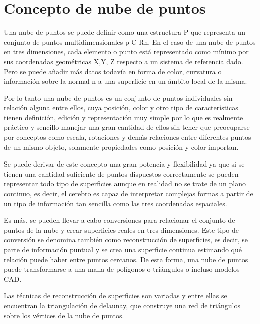 \section{Concepto de nube de puntos}

Una nube de puntos se puede definir como una estructura P que representa un conjunto de puntos multidimensionales p C Rn. En el caso de una nube de puntos en tres dimensiones, cada elemento o punto está representado como mínimo por sus coordenadas geométricas X,Y, Z respecto a un sistema de referencia dado. Pero se puede añadir más datos todavía en forma de color, curvatura o información sobre la normal n a una superficie en un ámbito local de la misma.  


Por lo tanto una nube de puntos es un conjunto de puntos individuales sin relación alguna entre ellos, cuya
posición, color y otro tipo de características tienen definición, edición y representación muy simple por lo
que es realmente práctico y sencillo manejar una gran cantidad de ellos sin tener que preocuparse por
conceptos como escala, rotaciones y demás relaciones entre diferentes puntos de un mismo objeto,
solamente propiedades como posición y color importan.




Se puede derivar de este concepto una gran potencia y flexibilidad ya que si se tienen una cantidad
suficiente de puntos dispuestos correctamente se pueden representar todo tipo de superficies aunque en
realidad no se trate de un plano continuo, es decir, el cerebro es capaz de interpretar complejas formas a
partir de un tipo de información tan sencilla como las tres coordenadas espaciales.

Es más, se pueden llevar a cabo conversiones para relacionar el conjunto de puntos de la nube y crear
superficies reales en tres dimensiones. Este tipo de conversión se denomina también como reconstrucción de superficies, es decir, se parte de información puntual y se crea una superficie continua estimando qué
relación puede haber entre puntos cercanos. De esta forma, una nube de puntos puede transformarse a una
malla de polígonos o triángulos o incluso modelos CAD.

Las técnicas de reconstrucción de superficies son variadas y entre ellas se encuentran la triangulación de
delaunay, que construye una red de triángulos sobre los vértices de la nube de puntos.


